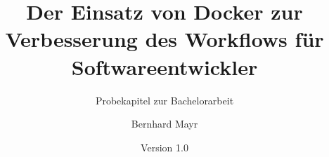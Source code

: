 \documentclass[a4paper, ngerman, bibliography=totoc]{scrreprt}  %
\title{Der Einsatz von Docker zur Verbesserung des Workflows für Softwareentwickler}
\subtitle{Probekapitel zur Bachelorarbeit}
\author{Bernhard Mayr}
\date{Version 1.0}
\begin{document}
\maketitle


\tableofcontents




\listoffigures{}
\lstlistoflistings{}
\printbibliography{}
\end{document}

